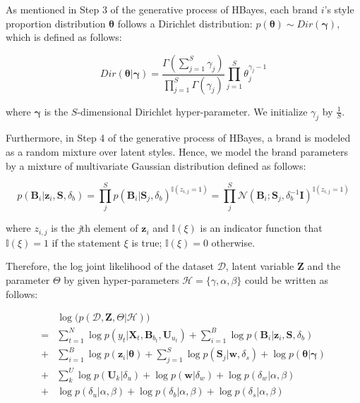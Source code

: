 As mentioned in Step 3 of the generative process of HBayes, each brand $i$'s style proportion distribution $\boldsymbol{\theta}$ follows a Dirichlet distribution: $p(\boldsymbol{\theta}) \sim Dir(\boldsymbol{\gamma})$, which is defined as follows: 

\begin{equation*}
Dir(\bm{\theta}|\bm{\gamma})=\frac{\Gamma(\sum_{j=1}^{S}\gamma_j)}{\prod_{j=1}^{S}\Gamma(\gamma_j)}\prod_{j=1}^S \theta_j^{\gamma_j-1}
\end{equation*}

\noindent where $\bm{\gamma}$ is the $S$-dimensional Dirichlet hyper-parameter. We initialize $\gamma_j$ by $\frac{1}{S}$. 

Furthermore, in Step 4 of the generative process of HBayes, a brand is modeled as a random mixture over latent styles. Hence, we model the brand parameters by a mixture of multivariate Gaussian distribution defined as follows:

\begin{equation*}
p(\bm{B}_i|\bm{z}_i,\bm{S},\delta_b) = \prod_{j}^S p(\bm{B}_i|\bm{S}_j,\delta_b)^{\mathbb{I}(z_{i,j}=1)} = \prod_{j}^S \mathcal{N}(\bm{B}_i; \bm{S}_j,\delta_b^{-1}\mathbf{I}) ^{\mathbb{I}(z_{i,j}=1)}
\end{equation*}

\noindent where $z_{i,j}$ is the \emph{j}th element of $\mathbf{z}_i$ and $\mathbb{I}(\xi)$ is an indicator function that $\mathbb{I}(\xi)=1$ if the statement $\xi$ is true; $\mathbb{I}(\xi)=0$ otherwise.

Therefore, the log joint likelihood of the dataset $\mathcal{D}$, latent variable $\bm{Z}$ and the parameter $\Theta$ by given hyper-parameters $\mathcal{H} = \{\gamma, \alpha,\beta\}$ could be written as follows:

\begin{align}
 & \log \big( p(\mathcal{D},\bm{Z},\Theta|\mathcal{H}) \big) \nonumber \\
= & \sum_{t=1}^N \log p(y_t|\bm{X}_t,\bm{B}_{b_t},\bm{U}_{u_t}) + \sum_{i=1}^B \log p(\bm{B}_i|\bm{z}_i,\bm{S},\delta_b)  \nonumber \\
+ & \sum_{i=1}^B \log p(\bm{z}_{i}|\bm{\theta}) + \sum_{j=1}^S \log p(\bm{S}_j|\bm{w},\delta_s) + \log p(\bm{\theta}|\bm{\gamma})   \nonumber \\
+ & \sum_{k}^U \log p(\bm{U}_k|\delta_u) + \log p(\bm{w}|\delta_w) +  \log p(\delta_w|\alpha,\beta) \nonumber  \\
+ & \log p(\delta_u|\alpha,\beta) + \log p(\delta_b|\alpha,\beta) + \log p(\delta_s|\alpha,\beta)
\label{eq:log_likelihood}
\end{align}

